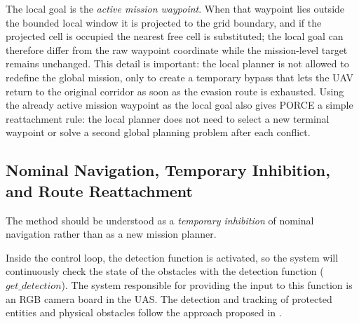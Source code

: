 \documentclass[electronics,article,submit,moreauthors]{Definitions/mdpi}
\DeclareRobustCommand{\deleted}[1]{}%
\DeclareRobustCommand{\added}[1]{#1}%
\DeclareRobustCommand{\deleted}[1]{\textcolor{black}{\sout{#1}}}
\DeclareRobustCommand{\added}[1]{\textcolor{green!50!black}{#1}}
\def\deleted#1{}%
\def\added#1{#1}%
\begin{document}
The local goal is the \emph{active mission waypoint}. When that waypoint lies outside the bounded local window it is projected to the grid boundary, and if the projected cell is occupied the nearest free cell is substituted; the local goal can therefore differ from the raw waypoint coordinate while the mission-level target remains unchanged. This detail is important: the local planner is not allowed to redefine the global mission, only to create a temporary bypass that lets the UAV return to the original corridor as soon as the evasion route is exhausted. \added{Using the already active mission waypoint as the local goal also gives PORCE a simple reattachment rule: the local planner does not need to select a new terminal waypoint or solve a second global planning problem after each conflict.}





\subsection{Nominal Navigation, Temporary Inhibition, and Route Reattachment}

The method should be understood as a \emph{temporary inhibition} of nominal navigation rather than as a new mission planner.

Inside the control loop, the detection function is activated, so the system will continuously check the state of the obstacles with the detection function ($get\_detection$). The system responsible for providing the input to this function is an RGB camera board in the UAS. \deleted{The methodology used}\added{The} detection \deleted{of non regulatory compliant items or}\added{and tracking of protected entities and} physical obstacles \deleted{is based on the tracking}\added{follow the approach} proposed \deleted{on}\added{in} \cite{alaez2023real}.
\end{document}
